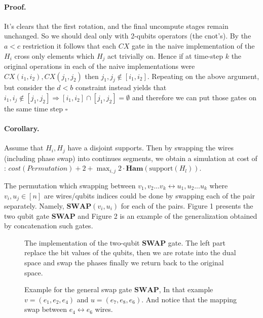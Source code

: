 \documentclass{article}
\begin{document}
\begin{multicols*}{2}
\paragraph{Proof.} It's clears that the first rotation, and the final uncompute stages remain unchanged. So we should deal only with 2-qubits operators (the cnot's). By the \( a < c \) restriction it follows that each \(CX\) gate in the naive implementation of the \(H_i\) cross only elements which \(H_j\) act trivially on. Hence if at time-step \(k\) the original operations in each of the naive implementations were \( CX(i_{1} , i_{2}), CX(j_{1} , j_{2}) \) then \( j_{1}, j_{j} \notin [i_{1} , i_{2}] \). Repeating on the above argument, but consider the \(d<b\) constraint instead yields that \( i_{1}, i_{j} \notin [j_{1} , j_{2}] \Rightarrow [i_{1},i_{2}]\cap[j_{1},j_{2}] = \emptyset  \) and therefore we can put those gates on the same time step \( \square\)   

\paragraph{Corollary.} Assume that \(H_{i}, H_{j}\) have a disjoint supports. Then by swapping the wires (including phase swap) into continues segments, we obtain a simulation at cost of : \( cost( Permutation ) + 2 + \max_{ {i,j} } 2 \cdot \textbf{Ham} ( \text{support} ( H_{l} ) )\).  

The permutation which swapping between \({ v_1 , v_2 ... v_k } \leftrightarrow { u_1 , u_2 ... u_k }\) where \(v_i,u_j \in [n]\) are wires/qubits indices could be done by swapping each of the pair separately. Namely, \(\textbf{SWAP}(v_{i},u_{i})\) for each of the pairs. Figure 1 presents the two qubit gate \textbf{SWAP} and Figure 2 is an example of the generalization obtained by concatenation such gates. 


\begin{figure}[H]
  \centering
    
    \caption{The implementation of the two-qubit \textbf{SWAP} gate. The left part replace the bit values of the qubits, then we are rotate into the dual space and swap the phases finally we return back to the original space.}
    \label{fig:average-data-vs-model}
\end{figure}

\begin{figure}[H]
  \centering
    
    \caption{Example for the general swap gate  \( \textbf{SWAP}\), In that example \(v = \left(e_1, e_2, e_4\right) \) and \(u = \left(e_7, e_8, e_6\right)\). And notice that the mapping swap between \( e_4 \leftrightarrow e_6\) wires.  }
    \label{fig:average-data-vs-model}
\end{figure}



\end{multicols*}
\end{document}
